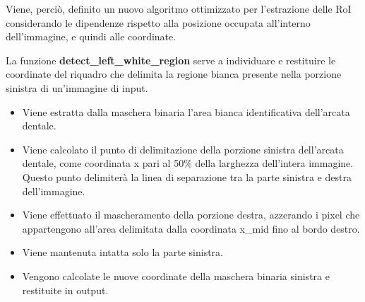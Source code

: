 \documentclass[12pt,a4paper,openright,twoside]{book}
\begin{document}
Viene, perciò, definito un nuovo algoritmo ottimizzato per l'estrazione delle RoI considerando le dipendenze rispetto alla posizione occupata all'interno dell'immagine, e quindi alle coordinate.

\begin{figure}[H]
    \centering
    
\end{figure}

La funzione \textbf{detect\_left\_white\_region} serve a individuare e restituire le coordinate del riquadro che delimita la regione bianca presente nella porzione sinistra di un'immagine di input.
\begin{itemize}
\item Viene estratta dalla maschera binaria l'area bianca identificativa dell'arcata dentale.
\item Viene calcolato il punto di delimitazione della porzione sinistra dell'arcata dentale, come coordinata x pari al 50\% della larghezza dell'intera immagine. Questo punto delimiterà la linea di separazione tra la parte sinistra e destra dell'immagine.
\item Viene effettuato il mascheramento della porzione destra, azzerando i pixel che appartengono all'area delimitata dalla coordinata x\_mid fino al bordo destro.
\item Viene mantenuta intatta solo la parte sinistra.
\item Vengono calcolate le nuove coordinate della maschera binaria sinistra e restituite in output.
\end{itemize}
\end{document}
